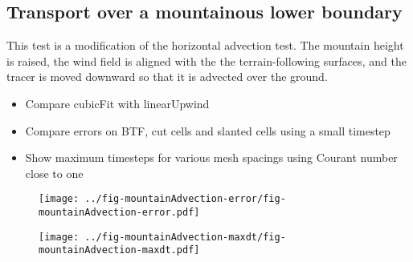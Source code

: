 \subsection{Transport over a mountainous lower boundary}
This test is a modification of the \citet{schaer2002} horizontal advection test.  The mountain height is raised, the wind field is aligned with the the terrain-following surfaces, and the tracer is moved downward so that it is advected over the ground.

\begin{itemize}
	\item Compare cubicFit with linearUpwind
	\item Compare errors on BTF, cut cells and slanted cells using a small timestep
	\item Show maximum timesteps for various mesh spacings using Courant number close to one
\end{itemize}

\begin{figure}
	\centering
	\texttt{[image: ../fig-mountainAdvection-error/fig-mountainAdvection-error.pdf]}
	\caption{}
\end{figure}

\begin{figure}
	\centering
	\texttt{[image: ../fig-mountainAdvection-maxdt/fig-mountainAdvection-maxdt.pdf]}
	\caption{}
\end{figure}

